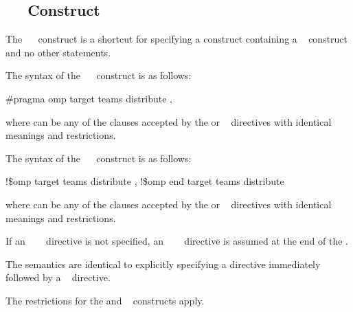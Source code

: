 \subsection{~~ Construct}
\label{subsec:target teams distribute construct}
\summary
The ~~ construct is a shortcut for specifying a  construct 
containing a ~ construct and no other statements.

\syntax
\ccppspecificstart
The syntax of the ~~ construct is as follows:

\begin{boxedcode}
\#pragma omp target teams distribute \plc{[clause[ [},\plc{] clause] ... ]}
\end{boxedcode}

where  can be any of the clauses accepted by the  or ~ directives 
with identical meanings and restrictions.
\ccppspecificend

\fortranspecificstart
The syntax of the ~~ construct is as follows:

\begin{boxedcode}
!\$omp target teams distribute \plc{[clause[ [},\plc{] clause] ... ]}
\plc{[}!\$omp end target teams distribute\plc{]}
\end{boxedcode}

where  can be any of the clauses accepted by the  or ~ directives 
with identical meanings and restrictions.

If an ~~~ directive is not specified, an 
~~~ directive is assumed at the end of the .
\fortranspecificend

\descr
The semantics are identical to explicitly specifying a  directive immediately 
followed by a ~ directive.

\restrictions
The restrictions for the  and ~ constructs apply.


